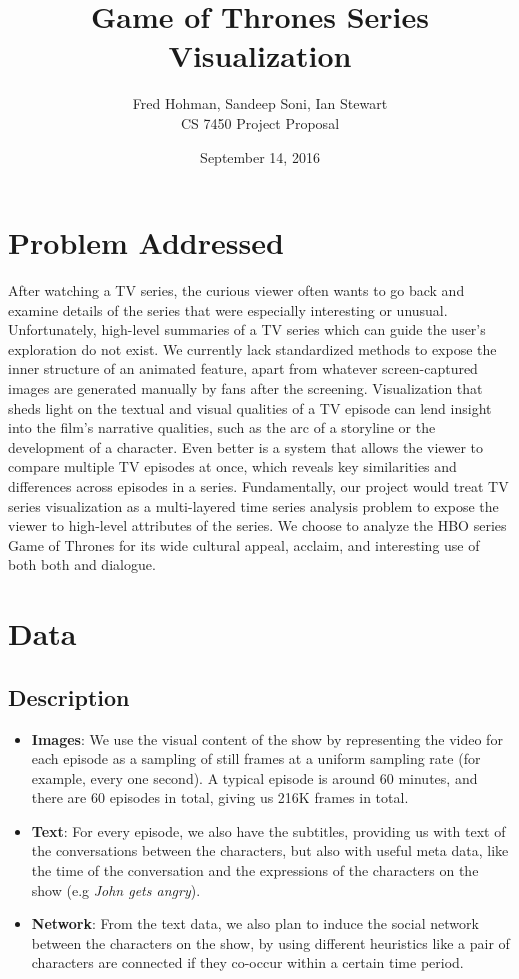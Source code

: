 \documentclass{article}
\title{Game of Thrones Series Visualization}
\author{Fred Hohman, Sandeep Soni, Ian Stewart\\CS 7450 Project Proposal}
\date{September 14, 2016}
\begin{document}
\maketitle

\section*{Problem Addressed}

After watching a TV series, the curious viewer often wants to go back and examine details of the series that were especially interesting or unusual. Unfortunately, high-level summaries of a TV series which can guide the user’s exploration do not exist. We currently lack standardized methods to expose the inner structure of an animated feature, apart from whatever screen-captured images are generated manually by fans after the screening. Visualization that sheds light on the textual and visual qualities of a TV episode can lend insight into the film’s narrative qualities, such as the arc of a storyline or the development of a character. Even better is a system that allows the viewer to compare multiple TV episodes at once, which reveals key similarities and differences across episodes in a series. Fundamentally, our project would treat TV series visualization as a multi-layered time series analysis problem to expose the viewer to high-level attributes of the series. We choose to analyze the HBO series Game of Thrones for its wide cultural appeal, acclaim, and interesting use of both both and dialogue. 

\section*{Data}
\subsection*{Description}
\begin{itemize}
\item \textbf{Images}: We use the visual content of the show by representing the video for each episode as a sampling of still frames at a uniform sampling rate (for example, every one second). A typical episode is around 60 minutes, and there are 60 episodes in total, giving us 216K frames in total.
\item \textbf{Text}: For every episode, we also have the subtitles, providing us with text of the conversations between the characters, but also with useful meta data, like the time of the conversation and the expressions of the characters on the show (e.g \textit{John gets angry}).
\item \textbf{Network}: From the text data, we also plan to induce the social network between the characters on the show, by using different heuristics like a pair of characters are connected if they co-occur within a certain time period. 
\end{itemize}
\end{document}

